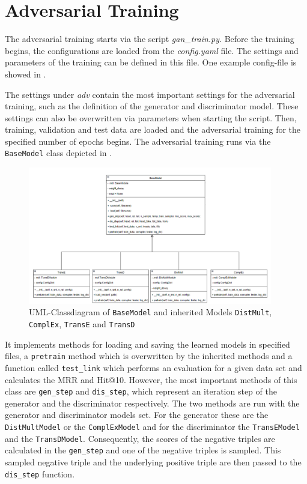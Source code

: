 \section{Adversarial Training}
\label{sec:adv_training}

The adversarial training starts via the script \textit{gan\_train.py}.
Before the training begins, the configurations are loaded from the \textit{config.yaml} file.
The settings and parameters of the training can be defined in this file.
One example config-file is showed in .

The settings under \textit{adv} contain the most important settings for the adversarial training, such as the definition of the generator and discriminator model.
These settings can also be overwritten via parameters when starting the script.
Then, training, validation and test data are loaded and the adversarial training for the specified number of epochs begins.
\newpage
The adversarial training runs via the \texttt{BaseModel} class depicted in .
\begin{figure}[t]
  \centering
    \includegraphics[width=0.95\textwidth]{figures/BaseModel.png}
  \caption{\ac{UML}-Classdiagram of \texttt{BaseModel} and inherited Models  \texttt{DistMult},  \texttt{ComplEx},  \texttt{TransE} and  \texttt{TransD}}
  \label{fig:basemodel_classdiagram}
\end{figure}
It implements methods for loading and saving the learned models in specified files, a \texttt{pretrain} method which is overwritten by the inherited methods and a function called \texttt{test\_link} which performs an evaluation for a given data set and calculates the MRR and Hit@10.
However, the most important methods of this class are \texttt{gen\_step} and \texttt{dis\_step}, which represent an iteration step of the generator and the discriminator respectively.
The two methods are run with the generator and discriminator models set.
For the generator these are the \texttt{DistMultModel} or the \texttt{ComplExModel} and for the discriminator the \texttt{TransEModel} and the \texttt{TransDModel}.
Consequently, the scores of the negative triples are calculated in the \texttt{gen\_step} and one of the negative triples is sampled.
This sampled negative triple and the underlying positive triple are then passed to the \texttt{dis\_step} function.

